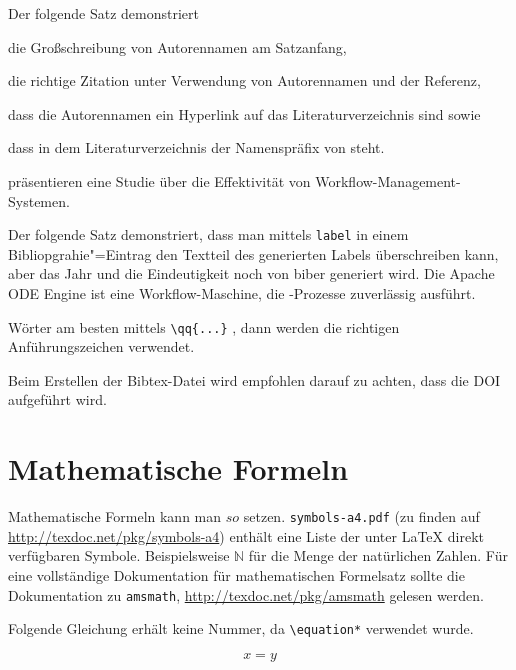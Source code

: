 Der folgende Satz demonstriert 
\begin{filecontents*}{\democodefile}
\begin{inparaenum}[1.]
  \item die Großschreibung von Autorennamen am Satzanfang,
  \item die richtige Zitation unter Verwendung von Autorennamen und der Referenz,
  \item dass die Autorennamen ein Hyperlink auf das Literaturverzeichnis sind sowie
  \item dass in dem Literaturverzeichnis der Namenspräfix  von  steht.
\end{inparaenum}
\end{filecontents*}


 präsentieren eine Studie über die Effektivität von Workflow-Management-Systemen.

Der folgende Satz demonstriert, dass man mittels \texttt{label} in einem Bibliopgrahie"=Eintrag den Textteil des generierten Labels überschreiben kann, aber das Jahr und die Eindeutigkeit noch von biber generiert wird.
Die Apache ODE Engine \cite{ApacheODE} ist eine Workflow-Maschine, die \BPEL-Prozesse zuverlässig ausführt.

Wörter am besten mittels \texttt{\textbackslash qq\{...\}} , dann werden die richtigen Anführungszeichen verwendet.

Beim Erstellen der Bibtex-Datei wird empfohlen darauf zu achten, dass die DOI aufgeführt wird.

\section{Mathematische Formeln}
\label{sec:mf}
Mathematische Formeln kann man $so$ setzen. \texttt{symbols-a4.pdf} (zu finden auf \url{http://texdoc.net/pkg/symbols-a4}) enthält eine Liste der unter LaTeX direkt verfügbaren Symbole.
Beispielsweise $\mathbb{N}$ für die Menge der natürlichen Zahlen.
Für eine vollständige Dokumentation für mathematischen Formelsatz sollte die Dokumentation zu \texttt{amsmath}, \url{http://texdoc.net/pkg/amsmath} gelesen werden.

Folgende Gleichung erhält keine Nummer, da \texttt{\textbackslash equation*} verwendet wurde.
\begin{filecontents*}{\democodefile}
\begin{equation*}
  x = y
\end{equation*}
\end{filecontents*}


